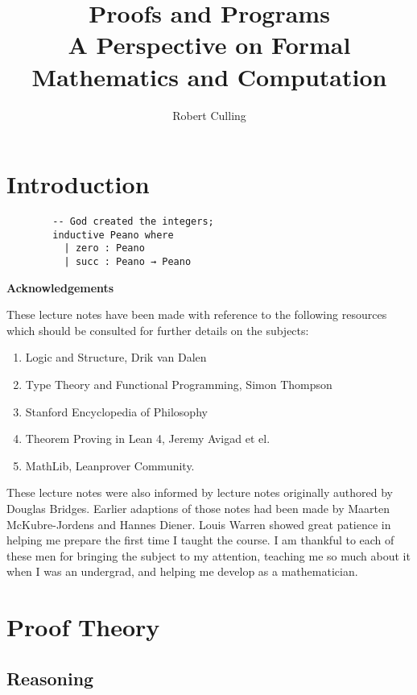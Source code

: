 \documentclass{book}
\title{Proofs and Programs \\
        \normalsize{A Perspective on Formal Mathematics and Computation}}
\author{Robert Culling}
\begin{document}
\maketitle

\tableofcontents

\chapter{Introduction}

    \begin{lstlisting}
        -- God created the integers;
        inductive Peano where
          | zero : Peano
          | succ : Peano → Peano
    \end{lstlisting}

 
        
    \newpage
    {\bf Acknowledgements} 
    
    These lecture notes have been made with reference to the following resources which should be consulted for further details on the subjects: 

        \begin{enumerate}
            \item Logic and Structure, Drik van Dalen \cite{vDalen}
            \item Type Theory and Functional Programming, Simon Thompson \cite{thompson}
            \item Stanford Encyclopedia of Philosophy
            \item Theorem Proving in Lean 4, Jeremy Avigad et el.
            \item MathLib, Leanprover Community. 
        \end{enumerate}    
    
    These lecture notes were also informed by lecture notes originally authored by Douglas Bridges. Earlier adaptions of those notes had been made by Maarten McKubre-Jordens and Hannes Diener. Louis Warren showed great patience in helping me prepare the first time I taught the course. I am thankful to each of these men for bringing the subject to my attention, teaching me so much about it when I was an undergrad, and helping me develop as a mathematician. 

    

\chapter{Proof Theory}

\section{Reasoning}
\end{document}
